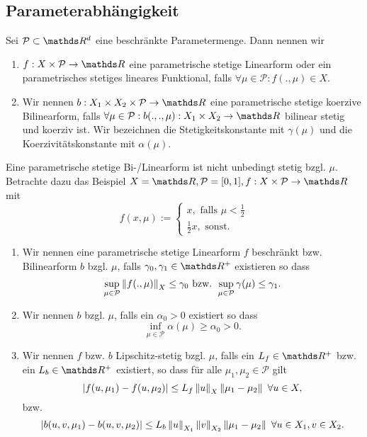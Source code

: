 \subsection{Parameterabhängigkeit}

Sei $\mathcal{P}\subset \R^d$ eine beschränkte Parametermenge.
Dann nennen wir 
\begin{enumerate}[(1)]
	\item $f:X\times \mathcal{P}\to \R$ eine parametrische stetige Linearform oder ein parametrisches stetiges lineares Funktional, falls $\forall \mu\in\mathcal{P}: f(.,\mu)\in X$.
	\item Wir nennen $b:X_1\times X_2\times \mathcal{P}\to \R$ eine parametrische stetige koerzive Bilinearform, falls $\forall \mu\in \mathcal{P}: b(.,.,\mu):X_1\times X_2\to \R$ bilinear stetig und koerziv ist. Wir bezeichnen die Stetigkeitskonstante mit $\gamma(\mu)$ und die Koerzivitätskonstante mit $\alpha(\mu)$.
\end{enumerate}

Eine parametrische stetige Bi-/Linearform ist nicht unbedingt stetig bzgl. $\mu$.
Betrachte dazu das Beispiel $X=\R,\mathcal{P}=[0,1],f:X\times \mathcal{P}\to\R$ mit
\[
f(x,\mu):=\left\{\begin{array}{l}x,\text{ falls }\mu<\frac{1}{2}\\ \frac{1}{2}x,\text{ sonst.}  \end{array}\right.
\]

\begin{enumerate}[(1)]
	\item Wir nennen eine parametrische stetige Linearform $f$ beschränkt bzw. Bilinearform $b$  bzgl. $\mu$, falls $\gamma_0,\gamma_1\in\R^+$ existieren so dass
	\[
	\sup\limits_{\mu\in\mathcal{P}}\left\Vert f(.,\mu)\right\Vert_X\le \gamma_0 \text{ bzw. } \sup\limits_{\mu\in\mathcal{P}}\gamma(\mu)\le \gamma_1.
	\]
	\item Wir nennen $b$  bzgl. $\mu$, falls ein $\alpha_0>0$ existiert so dass
	\[
	\inf\limits_{\mu \in \mathcal{P}} \alpha(\mu)\ge \alpha_0>0.
	\]
	\item Wir nennen $f$ bzw. $b$ Lipschitz-stetig bzgl. $\mu$, falls ein $L_f\in \R^+$ bzw. ein $L_b\in \R^+$ existiert, so dass für alle $\mu_1,\mu_2\in\mathcal{P}$ gilt
	\[
	\left\vert f(u,\mu_1)-f(u,\mu_2)\right\vert\le L_f\left\Vert u\right\Vert_X\left\Vert\mu_1-\mu_2\right\Vert ~\forall  u\in X,
	\]
	bzw.
	\[
	\left\vert b(u,v,\mu_1)-b(u,v,\mu_2)\right\vert\le L_b\left\Vert u\right\Vert_{X_1}\left\Vert v\right\Vert_{X_2}\left\Vert\mu_1-\mu_2\right\Vert~\forall u\in X_1,v\in X_2.
	\]
\end{enumerate}

